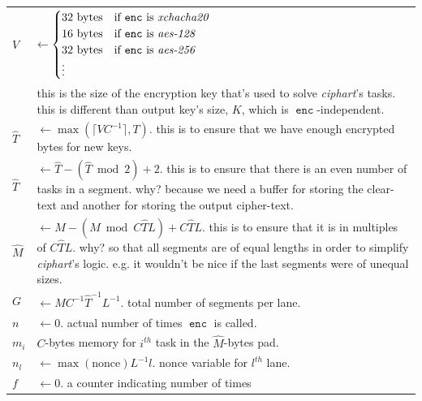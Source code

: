 \documentclass[twocolumn]{article}
\DeclareMathOperator{\enc}{\mathtt{enc}}
\DeclareMathOperator{\maxf}{max}
\begin{document}
\begin{tabularx}{\columnwidth}{lX}
    $V$ & $\gets \begin{cases}
                        32 \text{ bytes} & \text{if $\enc$ is
                                            \emph{xchacha20}}\\
                        16 \text{ bytes} & \text{if $\enc$ is
                            \emph{aes-128}}\\
                        32 \text{ bytes} & \text{if $\enc$ is
                            \emph{aes-256}}\\
                        \vdots & \\
                     \end{cases}$\\
                & this is the size of the encryption key that's used to
                    solve \emph{ciphart}'s tasks.  this is different than
                    output key's size, $K$, which is $\enc$-independent.\\
    $\hat T$    & $\gets \maxf(\lceil V C^{-1}\rceil, T)$.  this
                    is to ensure that we have enough encrypted bytes for
                    new keys.\\
    $\hat T$    & $\gets \hat T - (\hat T \bmod 2) + 2$.  this is to ensure
                    that there is an even number of tasks in a segment.
                    why?  because we need a buffer for storing the
                    clear-text and another for storing the output
                    cipher-text.\\
    $\hat M$    & $\gets M - (M \bmod C\hat TL) + C\hat TL$.  this is to
                    ensure that it is in multiples of $C\hat TL$.  why?  so
                    that all segments are of equal lengths in order to
                    simplify \emph{ciphart}'s logic.  e.g. it wouldn't be
                    nice if the last segments were of unequal sizes.\\
    $G$         & $\gets \hat MC^{-1}\hat T^{-1}L^{-1}$.  total number of
                    segments per lane.\\
    $n$    & $\gets 0$.  actual number of times $\enc$ is called.\\
    $m_i$       & $C$-bytes memory for $i^{th}$ task in the $\hat M$-bytes
                    pad.\\
    $n_l$       & $\gets \maxf(\text{nonce})L^{-1}l$.  nonce variable for
                    $l^{th}$ lane.\\
    $f$         & $\gets 0$.  a counter indicating number of times

\end{tabularx}
\end{document}
